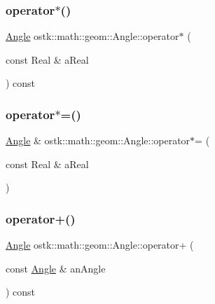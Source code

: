 \mbox{\label{classostk_1_1math_1_1geom_1_1_angle_a8b35f525ff9de7a3b59098c144f0b4b1}} 
\subsubsection{\texorpdfstring{operator$\ast$()}{operator*()}}
{\footnotesize\ttfamily \hyperlink{classostk_1_1math_1_1geom_1_1_angle}{Angle} ostk\+::math\+::geom\+::\+Angle\+::operator$\ast$ (\begin{DoxyParamCaption}\item[{const Real \&}]{a\+Real }\end{DoxyParamCaption}) const}

\mbox{\label{classostk_1_1math_1_1geom_1_1_angle_a1678d49f97ffd518275ef6e8427bd8d8}} 
\subsubsection{\texorpdfstring{operator$\ast$=()}{operator*=()}}
{\footnotesize\ttfamily \hyperlink{classostk_1_1math_1_1geom_1_1_angle}{Angle} \& ostk\+::math\+::geom\+::\+Angle\+::operator$\ast$= (\begin{DoxyParamCaption}\item[{const Real \&}]{a\+Real }\end{DoxyParamCaption})}

\mbox{\label{classostk_1_1math_1_1geom_1_1_angle_a8af6533c24da96b346917085632af922}} 
\subsubsection{\texorpdfstring{operator+()}{operator+()}\hspace{0.1cm}{\footnotesize\ttfamily [1/2]}}
{\footnotesize\ttfamily \hyperlink{classostk_1_1math_1_1geom_1_1_angle}{Angle} ostk\+::math\+::geom\+::\+Angle\+::operator+ (\begin{DoxyParamCaption}\item[{const \hyperlink{classostk_1_1math_1_1geom_1_1_angle}{Angle} \&}]{an\+Angle }\end{DoxyParamCaption}) const}

